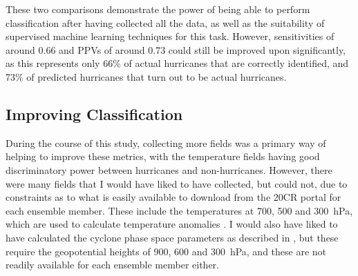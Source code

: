 \documentclass[pdftex,12pt,a4paper]{report}
\begin{document}
These two comparisons demonstrate the power of being able to perform classification after having
collected all the data, as well as the suitability of supervised machine learning techniques for
this task. However, sensitivities of around \SI{0.66}{} and PPVs of around \SI{0.73}{} could still
be improved upon significantly, as this represents only 66\% of actual hurricanes that are correctly
identified, and 73\% of predicted hurricanes that turn out to be actual hurricanes. 

\subsection{Improving Classification}
\label{sec:improving_classification}
During the course of this study, collecting more fields was a primary way of helping to improve
these metrics, with the temperature fields having good discriminatory power between hurricanes and
non-hurricanes.  However, there were many fields that I would have liked to have collected, but
could not, due to constraints as to what is easily available to download from the 20CR portal for
each ensemble member. These include the temperatures at \SI{700}{}, \SI{500}{} and \SI{300}{hPa},
which are used to calculate temperature anomalies \parencite{bengtsson1995hurricane,
yoshimura2006influence}. I would also have liked to have calculated the cyclone phase space
parameters as described in \textcite{evans2003objective, hart2003cyclone}, but these require the
geopotential heights of \SI{900}{}, \SI{600}{} and \SI{300}{hPa}, and these are not readily
available for each ensemble member either.  


\end{document}
